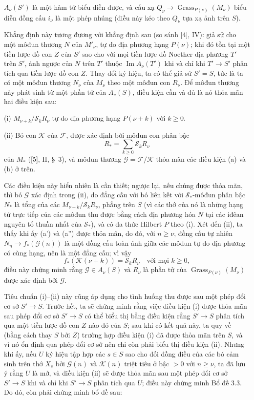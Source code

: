  $A_\nu(S')$ là một hàm tử biểu diễn được, và cấu xạ
$Q_\nu\longrightarrow\operatorname{Grass}_{P(\nu)}(M_\nu)$ biểu diễn đồng cấu
$i_\nu$ là một phép nhúng (điều này kéo theo $Q_\nu$ tựa xạ ảnh trên $S$).

Khẳng định này tương đương với khẳng định sau (so sánh [4], IV): giả sử cho
một môđun thương $N$ của $M'_\nu$, tự do địa phương hạng $P(\nu)$; khi đó tồn
tại một tiền lược đồ con $Z$ của $S'$ sao cho với mọi tiền lược đồ Noether địa
phương $T'$
trên $S'$, ảnh ngược của $N$ trên $T'$ thuộc
$\operatorname{Im}A_\nu(T')$ khi và chỉ khi $T'\longrightarrow S'$ phân tích
qua tiền lược đồ con $Z$. Thay đổi ký hiệu, ta có thể giả sử $S'=S$, tức là ta
có một môđun thương $N_\nu$ của $M_\nu$ theo một môđun con $R_\nu$. Để môđun
thương này phát sinh từ một phần tử của $A_\nu(S)$, điều kiện cần và đủ là nó
thỏa mãn hai điều kiện sau:

\medskip
\noindent (i) $M_{\nu+k}/\mathcal S_kR_\nu$ tự do địa phương hạng
$P(\nu+k)$ với $k\geq0$.

\smallskip
\noindent (ii) Bó con $\mathcal K$ của $\mathcal F$, được xác định bởi môđun
con phân bậc
\[
R_* =\sum_{k\geq0}\mathcal S_kR_\nu
\]
của $M_*$ ([5], II, \S~3), và môđun thương
$\mathcal G=\mathcal F/\mathcal K$ thỏa mãn các điều kiện (a) và (b) ở trên.

Các điều kiện này hiển nhiên là cần thiết; ngược lại, nếu chúng được thỏa mãn,
thì bó $\mathcal G$ xác định trong (ii), do đẳng cấu với bó liên kết với
$\mathcal S_*$-môđun phân bậc $N_*$ là tổng của các
$M_{\nu+k}/\mathcal S_kR_\nu$, phẳng trên $S$ (vì các thớ của nó là những hạng
tử trực tiếp của các môđun thu được bằng cách địa phương hóa $N$ tại các
iđêan nguyên tố thuần nhất của $\mathcal S_*$), và có đa thức Hilbert $P$ theo
(i). Xét đến (ii), ta
thấy khi ấy (a') và (a'') được thỏa mãn, do đó, với $n\geq\nu$, đồng cấu tự
nhiên $N_n\longrightarrow f_*(\mathcal G(n))$ là một đồng cấu toàn ánh giữa
các môđun tự do địa phương có cùng hạng, nên là một đẳng cấu; vì vậy
\[
f_*(\mathcal K(\nu+k))=\mathcal S_kR_\nu
\quad\text{với mọi $k\geq0$},
\]
điều này chứng minh rằng $\mathcal G\in A_\nu(S)$ và $R_\nu$ là phần tử của
$\operatorname{Grass}_{P(\nu)}(M_\nu)$ được xác định bởi $\mathcal G$.

Tiêu chuẩn (i)--(ii) này cũng áp dụng cho tình huống thu được sau một phép đổi
cơ sở $S'\longrightarrow S$. Trước hết, ta sẽ chứng minh rằng việc điều kiện
(i) được thỏa mãn sau phép đổi cơ sở $S'\longrightarrow S$ có thể biểu thị
bằng điều kiện rằng $S'\longrightarrow S$ phân tích qua một tiền lược đồ con
$Z$ nào đó của $S$; sau khi có kết quả này, ta quy về (bằng cách thay $S$ bởi
$Z$) trường hợp điều kiện (i) đã được thỏa mãn trên $S$, và vì nó ổn định qua
phép đổi cơ sở nên chỉ còn phải biểu thị điều kiện (ii). Nhưng khi ấy, nếu $U$
ký hiệu tập hợp các $s\in S$ sao cho đối đồng điều của các bó cảm sinh trên thớ
$X_s$ bởi $\mathcal G(n)$ và $\mathcal K(n)$ triệt tiêu ở bậc $>0$ với
$n\geq\nu$, ta đã lưu ý rằng $U$ là mở, và điều kiện (ii) sẽ được thỏa mãn sau
một phép đổi cơ sở $S'\longrightarrow S$ khi và chỉ khi
$S'\longrightarrow S$ phân tích qua $U$; điều này chứng minh Bổ đề 3.3. Do đó,
còn phải chứng minh bổ đề sau:

